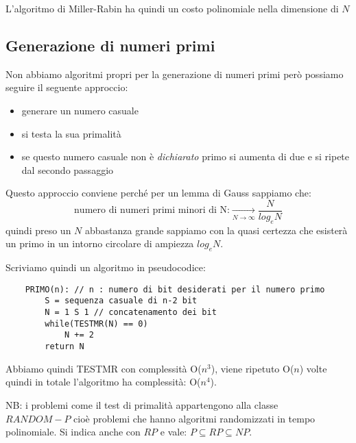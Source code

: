 L'algoritmo di Miller-Rabin ha quindi un costo polinomiale nella dimensione di $N$


\subsection{Generazione di numeri primi}
Non abbiamo algoritmi propri per la generazione di numeri primi però possiamo seguire il seguente approccio:
\begin{itemize}
    \item generare un numero casuale
    \item si testa la sua primalità
    \item se questo numero casuale non è \emph{dichiarato} primo si aumenta di due e si ripete dal secondo passaggio
\end{itemize}

Questo approccio conviene perché per un lemma di Gauss sappiamo che:
$$ \text{numero di numeri primi minori di N:} \xrightarrow[N \to \infty]{} \frac{N}{log_eN} $$
quindi preso un $N$ abbastanza grande sappiamo con la quasi certezza che esisterà un primo in un intorno circolare di ampiezza $log_eN$.

Scriviamo quindi un algoritmo in pseudocodice:
\begin{verbatim}
    PRIMO(n): // n : numero di bit desiderati per il numero primo
        S = sequenza casuale di n-2 bit
        N = 1 S 1 // concatenamento dei bit
        while(TESTMR(N) == 0)
            N += 2
        return N
\end{verbatim}
Abbiamo quindi TESTMR con complessità O($n^3$), viene ripetuto O($n$) volte quindi in totale l'algoritmo ha complessità: O($n^4$).

NB: i problemi come il test di primalità appartengono alla classe \\ $RANDOM-P$ cioè problemi che hanno algoritmi randomizzati in tempo polinomiale.
Si indica anche con $RP$ e vale: $P \subseteq RP \subseteq NP $.